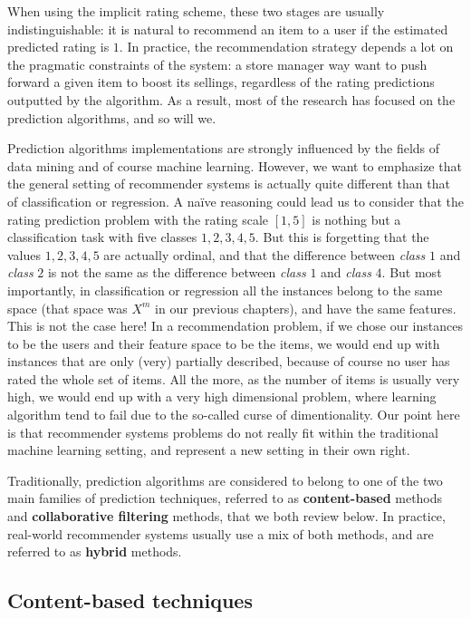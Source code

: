 When using the implicit rating scheme, these two stages are usually
indistinguishable: it is natural to recommend an item to a user if the
estimated predicted rating is $1$. In practice, the recommendation strategy
depends a lot on the pragmatic constraints of the system: a store manager way
want to push forward a given item to boost its sellings, regardless of the
rating predictions outputted by the algorithm. As a result, most of the
research has focused on the prediction algorithms, and so will we.

Prediction algorithms implementations are strongly influenced by the fields of
data mining and of course machine learning. However, we want to emphasize that
the general setting of recommender systems is actually quite different than
that of classification or regression. A naïve reasoning could lead us to
consider that the rating prediction problem with the rating scale $[1, 5]$ is
nothing but a classification task with five classes $1, 2, 3, 4, 5$. But this is
forgetting that the values $1, 2, 3, 4, 5$ are actually ordinal, and that the
difference between \textit{class} $1$ and \textit{class} $2$ is not the same as the
difference between \textit{class} $1$ and \textit{class} $4$. But most
importantly, in classification or regression all the instances belong to the
same space (that space was $X^m$ in our previous chapters), and have the same
features. This is not the case here! In a recommendation problem, if we chose
our instances to be the users and their feature space to be the items, we would
end up with instances that are only (very) partially described, because of
course no user has rated the whole set of items. All the more, as the number of
items is usually very high, we would end up with a very high dimensional
problem, where learning algorithm tend to fail due to the so-called curse of
dimentionality. Our point here is that recommender systems problems do not
really fit within the traditional machine learning setting, and represent a new
setting in their own right.

Traditionally, prediction algorithms are
considered to belong to one of the two main families of prediction techniques,
referred to as \textbf{content-based} methods and \textbf{collaborative
filtering} methods, that we both review below. In practice, real-world
recommender systems usually use a mix of both methods, and are referred to as
\textbf{hybrid} methods.

\subsection{Content-based techniques}
\label{SEC:collaborative_filtering}

